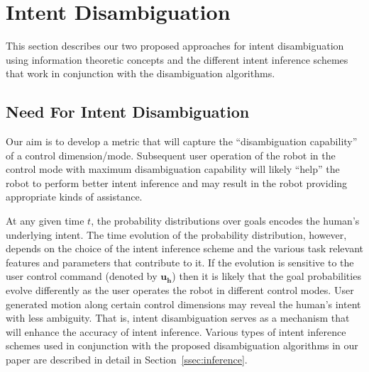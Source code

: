 \documentclass[conference]{IEEEtran}
\begin{document}
\section{Intent Disambiguation}\label{sec:disamb}

This section describes our two proposed approaches for intent disambiguation using information theoretic concepts and the different intent inference schemes that work in conjunction with the disambiguation algorithms. 

\subsection{Need For Intent Disambiguation}

Our aim is to develop a metric that will capture the ``disambiguation capability'' of a control dimension/mode. Subsequent user operation of the robot in the control mode with maximum disambiguation capability will likely ``help'' the robot to perform better intent inference and may result in the robot providing appropriate kinds of assistance.

At any given time $t$, the probability distributions over goals encodes the human's underlying intent. The time evolution of the probability distribution, however, depends on the choice of the intent inference scheme and the various task relevant features and parameters that contribute to it. If the evolution is sensitive to the user control command (denoted by $\boldsymbol{u_h}$) then it is likely that the goal probabilities evolve differently as the user operates the robot in different control modes. User generated motion along certain control dimensions may reveal the human's intent with less ambiguity. That is, intent disambiguation serves as a mechanism that will enhance the accuracy of intent inference. Various types of intent inference schemes used in conjunction with the proposed disambiguation algorithms in our paper are described in detail in Section~\ref{ssec:inference}. 
\end{document}
